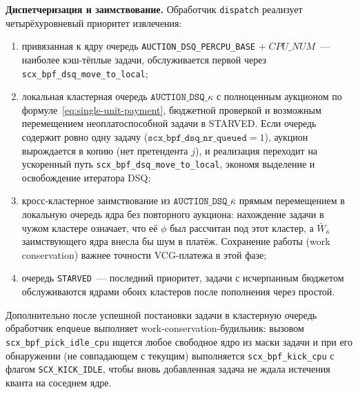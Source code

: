 \documentclass[14pt, oneside]{extbook}
\begin{document}
        \textbf{Диспетчеризация и заимствование.}
        Обработчик \texttt{dispatch} реализует четырёхуровневый
        приоритет извлечения:
        \begin{sloppypar}
        \begin{enumerate}
                \item привязанная к ядру очередь
                        \texttt{AUCTION\_\allowbreak DSQ\_\allowbreak PERCPU\_BASE}
                        $+\;\mathit{CPU\_NUM}$~--- наиболее
                        кэш-тёплые задачи, обслуживается
                        первой через
                        \texttt{scx\_bpf\_dsq\_\allowbreak move\_to\_local};
                \item локальная кластерная очередь
                        $\texttt{AUCTION\_DSQ\_}\kappa$ с
                        полноценным аукционом по
                        формуле~\eqref{eq:single-unit-payment},
                        бюджетной проверкой и возможным
                        перемещением неоплатоспособной задачи в
                        STARVED. Если очередь содержит ровно
                        одну задачу
                        ($\texttt{scx\_bpf\_dsq\_nr\_queued} = 1$),
                        аукцион вырождается в копию (нет
                        претендента $j$), и реализация
                        переходит на ускоренный путь
                        \texttt{scx\_bpf\_dsq\_move\_to\_local},
                        экономя выделение и освобождение
                        итератора DSQ;
                \item кросс-кластерное заимствование из
                        $\texttt{AUCTION\_DSQ\_}\bar\kappa$
                        прямым перемещением в локальную
                        очередь ядра без повторного аукциона:
                        нахождение задачи в чужом кластере
                        означает, что её $\phi$ был рассчитан
                        под этот кластер, а $\bar W_{\bar\kappa}$
                        заимствующего ядра внесла бы шум в
                        платёж. Сохранение работы (work
                        conservation) важнее точности
                        VCG-платежа в этой фазе;
                \item очередь \texttt{STARVED}~--- последний
                        приоритет, задачи с исчерпанным
                        бюджетом обслуживаются ядрами обоих
                        кластеров после пополнения через
                        простой.
        \end{enumerate}
        \end{sloppypar}
        Дополнительно после успешной постановки задачи в
        кластерную очередь обработчик \texttt{enqueue}
        выполняет work-conservation-будильник: вызовом
        \texttt{scx\_bpf\_pick\_idle\_cpu} ищется любое
        свободное ядро из маски задачи и при его
        обнаружении (не совпадающем с текущим)
        выполняется \texttt{scx\_bpf\_kick\_cpu} с флагом
        \texttt{SCX\_KICK\_IDLE}, чтобы вновь добавленная
        задача не ждала истечения кванта на соседнем ядре.
\end{document}
